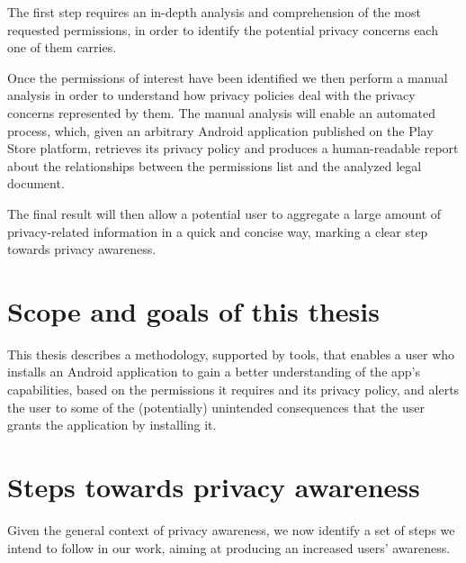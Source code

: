The first step requires an in-depth analysis and comprehension of the most requested permissions, in order to identify the potential privacy concerns each one of them carries.

Once the permissions of interest have been identified we then perform a manual analysis in order to understand how privacy policies deal with the privacy concerns represented by them. The manual analysis will enable an automated process, which, given an arbitrary Android application published on the Play Store platform, retrieves its privacy policy and produces a human-readable report about the relationships between the permissions list and the analyzed legal document.

The final result will then allow a potential user to aggregate a large amount of privacy-related information in a quick and concise way, marking a clear step towards privacy awareness.


\section{Scope and goals of this thesis}
This thesis describes a methodology, supported by tools, that enables a user who installs an Android application to gain a better understanding of the app's capabilities, based on the permissions it requires and its privacy policy, and alerts the user to some of the (potentially) unintended consequences that the user grants the application by installing it.

\section{Steps towards privacy awareness}
Given the general context of privacy awareness, we now identify a set of steps we intend to follow in our work, aiming at producing an increased users' awareness.

